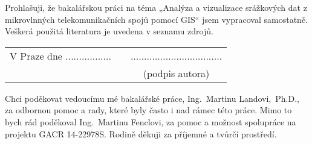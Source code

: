\newcommand{\odsaditodzhora}{\hskip1pt\vfill}

\odsaditodzhora
{}

 \baselineskip

Prohlašuji, že bakalářskou práci na téma „Analýza a vizualizace
srážkových dat z mikrovlnných telekomunikačních spojů pomocí GIS“ jsem
vypracoval samostatně. Veškerá použitá literatura je uvedena v seznamu
zdrojů.

\begin{flushleft}
\begin{tabular}{cp{}c}
V Praze dne .................
& 
&
..................................
\\
&&
(podpis autora)
\end{tabular}

\end{flushleft}
\newpage

\odsaditodzhora
{}

 \baselineskip

Chci poděkovat vedoucímu mé bakalářské práce, Ing.~Martinu
Landovi,~Ph.D., za odbornou pomoc a rady, které byly často i nad rámec
této práce. Mimo to bych rád poděkoval Ing.~Martinu Fenclovi, za pomoc
a možnost spolupráce na projektu GACR 14-22978S. Rodině děkuji za příjemné a tvůrčí
prostředí.

\newpage
